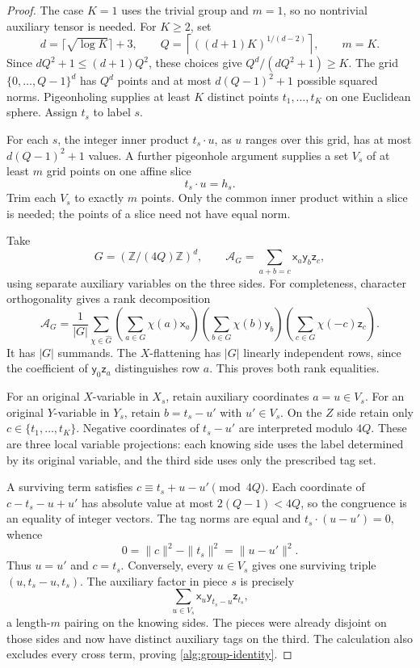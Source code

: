 \documentclass[11pt]{article}
\numberwithin{equation}{section}
\theoremstyle{definition}
\theoremstyle{remark}
\newcommand{\Z}{\mathbb Z}
\begin{document}
\begin{proof}
The case \(K=1\) uses the trivial group and \(m=1\), so no
nontrivial auxiliary tensor is needed.
For \(K\geq2\), set
\[
 d=\lceil\sqrt{\log K}\rceil+3,
 \qquad
 Q=\left\lceil((d+1)K)^{1/(d-2)}\right\rceil,
 \qquad m=K.
\]
Since \(dQ^2+1\leq(d+1)Q^2\), these choices give
\(Q^d/(dQ^2+1)\geq K\).
The grid \(\{0,\ldots,Q-1\}^d\) has \(Q^d\) points and at most
\(d(Q-1)^2+1\) possible squared norms.  Pigeonholing supplies at least
\(K\) distinct points \(t_1,\ldots,t_K\) on one Euclidean sphere.
Assign \(t_s\) to label \(s\).

For each \(s\), the integer inner product \(t_s\cdot u\), as \(u\)
ranges over this grid, has at most \(d(Q-1)^2+1\) values.  A further
pigeonhole argument supplies a set \(V_s\) of at least \(m\) grid points
on one affine slice
\[
 t_s\cdot u=h_s.
\]
Trim each \(V_s\) to exactly \(m\) points.  Only the common inner product
within a slice is needed; the points of a slice need not have equal norm.

Take
\[
 G=(\Z/(4Q)\Z)^d,
 \qquad
 \mathcal A_G=\sum_{a+b=c}\mathsf{x}_a\mathsf{y}_b\mathsf{z}_c,
\]
using separate auxiliary variables on the three sides.  For completeness,
character orthogonality gives a rank decomposition
\[
 \mathcal A_G=\frac1{|G|}\sum_{\chi\in\widehat G}
 \left(\sum_{a\in G}\chi(a)\mathsf{x}_a\right)
 \left(\sum_{b\in G}\chi(b)\mathsf{y}_b\right)
 \left(\sum_{c\in G}\chi(-c)\mathsf{z}_c\right).
\]
It has \(|G|\) summands.  The \(X\)-flattening has \(|G|\) linearly
independent rows, since the coefficient of
\(\mathsf{y}_0\mathsf{z}_a\) distinguishes row
\(a\).  This proves both rank equalities.

For an original \(X\)-variable in \(X_s\), retain auxiliary coordinates
\(a=u\in V_s\).  For an original \(Y\)-variable in \(Y_s\), retain
\(b=t_s-u'\) with \(u'\in V_s\).  On the \(Z\) side retain only
\(c\in\{t_1,\ldots,t_K\}\).  Negative coordinates of \(t_s-u'\)
are interpreted modulo \(4Q\).  These are three local variable
projections: each knowing side uses the label determined by its original
variable, and the third side uses only the prescribed tag set.

A surviving term satisfies
\(c\equiv t_s+u-u'\pmod{4Q}\).
Each coordinate of \(c-t_s-u+u'\) has absolute value at most
\(2(Q-1)<4Q\), so the congruence is an equality of integer vectors.
The tag norms are equal and
\(t_s\cdot(u-u')=0\), whence
\[
 0=\|c\|^2-\|t_s\|^2=\|u-u'\|^2.
\]
Thus \(u=u'\) and \(c=t_s\).  Conversely, every \(u\in V_s\) gives
one surviving triple \((u,t_s-u,t_s)\).
The auxiliary factor in piece \(s\) is precisely
\[
 \sum_{u\in V_s}\mathsf{x}_u\mathsf{y}_{t_s-u}\mathsf{z}_{t_s},
\]
a length-\(m\) pairing on the knowing sides.  The pieces were already
disjoint on those sides and now have distinct auxiliary tags on the third.
The calculation also excludes every cross term, proving
\eqref{alg:group-identity}.


\end{proof}
\end{document}

